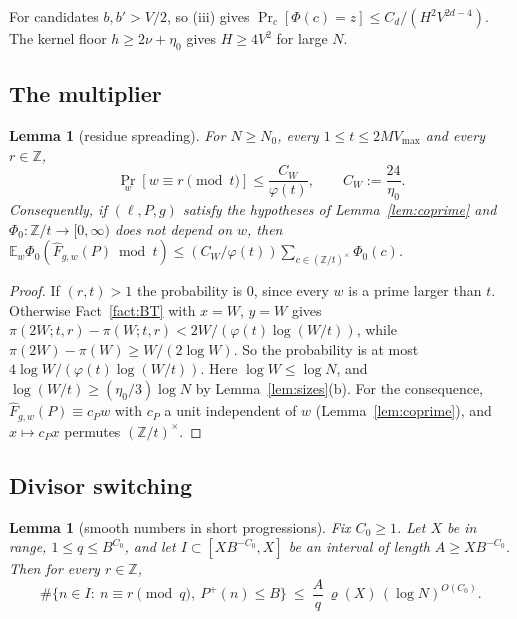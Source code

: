 \documentclass[11pt]{amsart}
\newtheorem{lemma}[theorem]{Lemma}
\theoremstyle{definition}
\newcommand{\Z}{\mathbb{Z}}
\newcommand{\VM}{V_{\max}}
\newcommand{\Ex}{\mathbb{E}}
\newcommand{\Prob}{\Pr}
\newcommand{\Pp}{P^{+}}
\begin{document}
For candidates $b,b'>V/2$, so (iii) gives $\Prob_c[\Phi(c)=z]\le C_d/(H^2V^{2d-4})$. The kernel floor $h\ge2\nu+\eta_0$ gives
$H\ge4V^2$ for large $N$.

\subsection{The multiplier}

\begin{lemma}[residue spreading]\label{lem:W}
For $N\ge N_0$, every $1\le t\le2M\VM$ and every $r\in\Z$,
\[
\Prob_w[w\equiv r\pmod t]\le\frac{C_W}{\varphi(t)},\qquad C_W:=\frac{24}{\eta_0}.
\]
Consequently, if $(\ell,P,g)$ satisfy the hypotheses of Lemma~\ref{lem:coprime} and $\Phi_0:\Z/t\to[0,\infty)$ does not
depend on $w$, then $\Ex_w\Phi_0(\hat F_{g,w}(P)\bmod t)\le(C_W/\varphi(t))\sum_{c\in(\Z/t)^\times}\Phi_0(c)$.
\end{lemma}

\begin{proof}
If $(r,t)>1$ the probability is $0$, since every $w$ is a prime larger than $t$. Otherwise Fact~\ref{fact:BT} with $x=W$, $y=W$ gives
$\pi(2W;t,r)-\pi(W;t,r)<2W/(\varphi(t)\log(W/t))$, while $\pi(2W)-\pi(W)\ge W/(2\log W)$. So the probability is at most
$4\log W/(\varphi(t)\log(W/t))$. Here $\log W\le\log N$, and $\log(W/t)\ge(\eta_0/3)\log N$ by Lemma~\ref{lem:sizes}(b). For the
consequence, $\hat F_{g,w}(P)\equiv c_Pw$ with $c_P$ a unit independent of $w$ (Lemma~\ref{lem:coprime}), and $x\mapsto c_Px$ permutes
$(\Z/t)^\times$.
\end{proof}

\subsection{Divisor switching}

\begin{lemma}[smooth numbers in short progressions]\label{lem:DS}
Fix $C_0\ge1$. Let $X$ be in range, $1\le q\le B^{C_0}$, and let $I\subset[XB^{-C_0},X]$ be an interval of length $A\ge XB^{-C_0}$.
Then for every $r\in\Z$,
\[
\#\{n\in I:\ n\equiv r\pmod q,\ \Pp(n)\le B\}\ \le\ \frac Aq\,\varrho(X)\,(\log N)^{O(C_0)}.
\]
\end{lemma}
\end{document}
